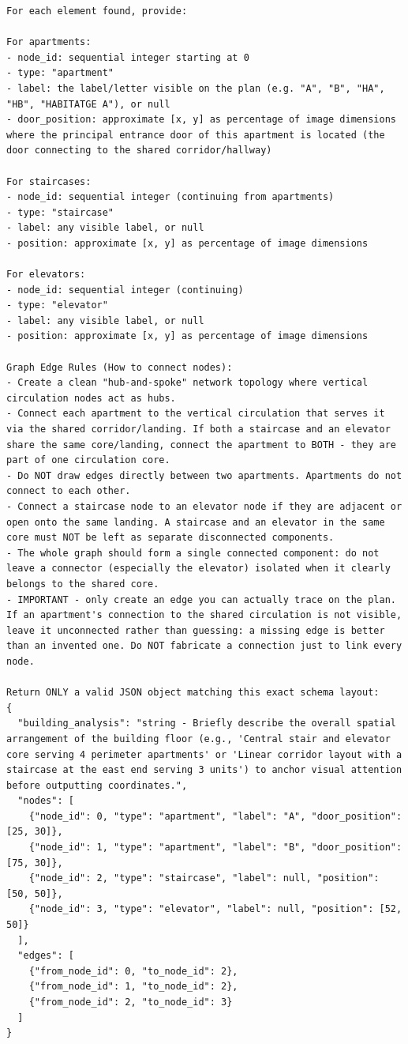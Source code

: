 \documentclass[12pt,a4paper,openright]{report}
\begin{document}
\begin{appendices}
\begin{lstlisting}[style=prompt]
For each element found, provide:

For apartments:
- node_id: sequential integer starting at 0
- type: "apartment"
- label: the label/letter visible on the plan (e.g. "A", "B", "HA", "HB", "HABITATGE A"), or null
- door_position: approximate [x, y] as percentage of image dimensions where the principal entrance door of this apartment is located (the door connecting to the shared corridor/hallway)

For staircases:
- node_id: sequential integer (continuing from apartments)
- type: "staircase"
- label: any visible label, or null
- position: approximate [x, y] as percentage of image dimensions

For elevators:
- node_id: sequential integer (continuing)
- type: "elevator"
- label: any visible label, or null
- position: approximate [x, y] as percentage of image dimensions

Graph Edge Rules (How to connect nodes):
- Create a clean "hub-and-spoke" network topology where vertical circulation nodes act as hubs.
- Connect each apartment to the vertical circulation that serves it via the shared corridor/landing. If both a staircase and an elevator share the same core/landing, connect the apartment to BOTH - they are part of one circulation core.
- Do NOT draw edges directly between two apartments. Apartments do not connect to each other.
- Connect a staircase node to an elevator node if they are adjacent or open onto the same landing. A staircase and an elevator in the same core must NOT be left as separate disconnected components.
- The whole graph should form a single connected component: do not leave a connector (especially the elevator) isolated when it clearly belongs to the shared core.
- IMPORTANT - only create an edge you can actually trace on the plan. If an apartment's connection to the shared circulation is not visible, leave it unconnected rather than guessing: a missing edge is better than an invented one. Do NOT fabricate a connection just to link every node.

Return ONLY a valid JSON object matching this exact schema layout:
{
  "building_analysis": "string - Briefly describe the overall spatial arrangement of the building floor (e.g., 'Central stair and elevator core serving 4 perimeter apartments' or 'Linear corridor layout with a staircase at the east end serving 3 units') to anchor visual attention before outputting coordinates.",
  "nodes": [
    {"node_id": 0, "type": "apartment", "label": "A", "door_position": [25, 30]},
    {"node_id": 1, "type": "apartment", "label": "B", "door_position": [75, 30]},
    {"node_id": 2, "type": "staircase", "label": null, "position": [50, 50]},
    {"node_id": 3, "type": "elevator", "label": null, "position": [52, 50]}
  ],
  "edges": [
    {"from_node_id": 0, "to_node_id": 2},
    {"from_node_id": 1, "to_node_id": 2},
    {"from_node_id": 2, "to_node_id": 3}
  ]
}
\end{lstlisting}


\end{appendices}
\end{document}

